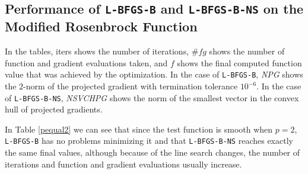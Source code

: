 \subsection{Performance of \texttt{L-BFGS-B} and \texttt{L-BFGS-B-NS} on the Modified Rosenbrock Function}

In the tables, iters shows the number of iterations, $\#fg$ shows the number of function and gradient evaluations taken, and $f$ shows the final computed function value that was achieved by the optimization. In the case of \texttt{L-BFGS-B}, \emph{NPG} shows the $2$-norm of the projected gradient with termination tolerance $10^{-6}$. In the case of \texttt{L-BFGS-B-NS}, \emph{NSVCHPG} shows the norm of the smallest vector in the convex hull of projected gradients. 

In Table \ref{pequal2} we can see that since the test function is smooth when $p = 2$, \texttt{L-BFGS-B} has no problems minimizing it and that \texttt{L-BFGS-B-NS} reaches exactly the same final values, although because of the line search changes, the number of iterations and function and gradient evaluations usually increase.

